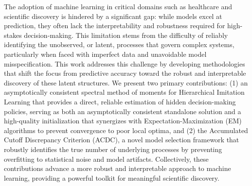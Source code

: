 \begin{abstract}
\end{abstract}

\begin{keyword}
The adoption of machine learning in critical domains such as healthcare and 
scientific discovery is hindered by a significant gap: while models excel at 
prediction, they often lack the interpretability and robustness required for 
high-stakes decision-making. This limitation stems from the difficulty 
of reliably identifying the unobserved, or latent, processes that govern complex systems, 
particularly when faced with imperfect data and unavoidable model misspecification. 
This work addresses this challenge by developing methodologies that 
shift the focus from predictive accuracy toward the robust and interpretable 
discovery of these latent structures. We present two primary contributions: 
(1) an asymptotically consistent spectral method of moments for 
Hierarchical Imitation Learning that provides a direct, 
reliable estimation of hidden decision-making policies, 
serving as both an asymptotically consistent standalone solution and 
a high-quality initialization that synergizes with 
Expectation-Maximization (EM) algorithms to prevent convergence to poor local optima, 
and (2) the Accumulated Cutoff Discrepancy Criterion (ACDC), 
a novel model selection framework that robustly identifies the true number 
of underlying processes by preventing overfitting to statistical noise and model artifacts. 
Collectively, these contributions advance 
a more robust and interpretable approach to machine learning, 
providing a powerful toolkit for meaningful scientific discovery.
\end{keyword}

